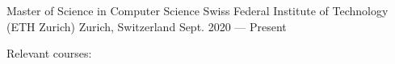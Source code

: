 

\begin{cventries}

    \cventry
    {Master of Science in Computer Science}
    {Swiss Federal Institute of Technology (ETH Zurich)}
    {Zurich, Switzerland}
    {Sept. 2020 --- Present}
    {
        \begin{cvitems}
            \item Relevant courses:
            \begin{flushleft}
                \bsep {}
                \bsep {}
                \bsep {} \\
                \bsep {}
                \end{flushleft}
        \end{cvitems}
    }


\end{cventries}
